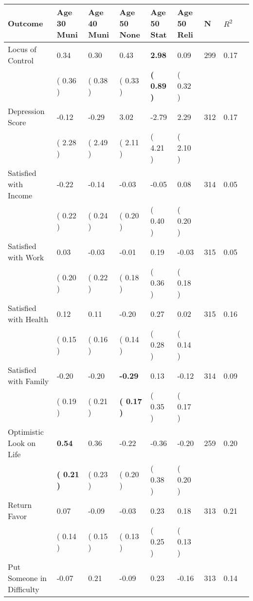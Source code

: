 \begin{tabular}{L{6.2cm} C{1.8cm} C{1.8cm} C{1.8cm} C{1.8cm} C{1.8cm} C{1.8cm} C{0.3cm} C{0.3cm}}
\toprule
 \textbf{Outcome} & \textbf{Age 30 Muni} & \textbf{Age 40 Muni} & \textbf{Age 50 None} & \textbf{Age 50 Stat} & \textbf{Age 50 Reli} & \textbf{N} & \textbf{$ R^2$} \\
\midrule
Locus of Control &      0.34 &      0.30 &      0.43 & \textbf{     2.98} &      0.09  & 299 &       0.17 \\ 
 & (     0.36 ) & (     0.38 ) & (     0.33 ) & \textbf{(     0.89 )} & (     0.32 )  & \\
Depression Score &     -0.12 &     -0.29 &      3.02 &     -2.79 &      2.29  & 312 &       0.17 \\ 
 & (     2.28 ) & (     2.49 ) & (     2.11 ) & (     4.21 ) & (     2.10 )  & \\
Satisfied with Income &     -0.22 &     -0.14 &     -0.03 &     -0.05 &      0.08  & 314 &       0.05 \\ 
 & (     0.22 ) & (     0.24 ) & (     0.20 ) & (     0.40 ) & (     0.20 )  & \\
Satisfied with Work &      0.03 &     -0.03 &     -0.01 &      0.19 &     -0.03  & 315 &       0.05 \\ 
 & (     0.20 ) & (     0.22 ) & (     0.18 ) & (     0.36 ) & (     0.18 )  & \\
Satisfied with Health &      0.12 &      0.11 &     -0.20 &      0.27 &      0.02  & 315 &       0.16 \\ 
 & (     0.15 ) & (     0.16 ) & (     0.14 ) & (     0.28 ) & (     0.14 )  & \\
Satisfied with Family &     -0.20 &     -0.20 & \textbf{    -0.29} &      0.13 &     -0.12  & 314 &       0.09 \\ 
 & (     0.19 ) & (     0.21 ) & \textbf{(     0.17 )} & (     0.35 ) & (     0.17 )  & \\
Optimistic Look on Life & \textbf{     0.54} &      0.36 &     -0.22 &     -0.36 &     -0.20  & 259 &       0.20 \\ 
 & \textbf{(     0.21 )} & (     0.23 ) & (     0.20 ) & (     0.38 ) & (     0.20 )  & \\
Return Favor &      0.07 &     -0.09 &     -0.03 &      0.23 &      0.18  & 313 &       0.21 \\ 
 & (     0.14 ) & (     0.15 ) & (     0.13 ) & (     0.25 ) & (     0.13 )  & \\
Put Someone in Difficulty &     -0.07 &      0.21 &     -0.09 &      0.23 &     -0.16  & 313 &       0.14 \\ 

\end{tabular}
